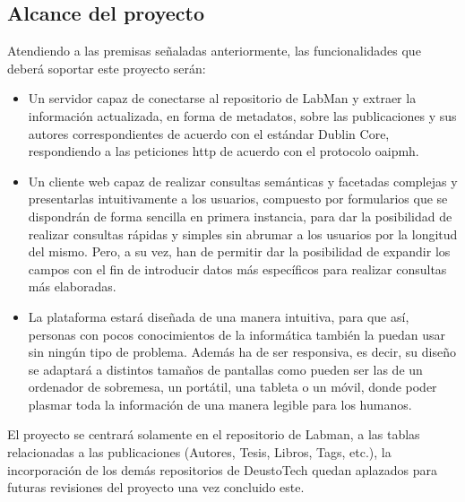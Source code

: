 \subsection{Alcance del proyecto}

Atendiendo a las premisas señaladas anteriormente, las funcionalidades que deberá soportar este proyecto serán:

\begin{itemize}
	\item Un servidor capaz de conectarse al repositorio de LabMan y extraer la información actualizada, en forma de metadatos, sobre las publicaciones y sus autores correspondientes de acuerdo con el estándar Dublin Core, respondiendo a las peticiones \acrshort{http} de acuerdo con el protocolo \acrshort{oaipmh}.
	
	\item Un cliente web capaz de realizar consultas semánticas y facetadas complejas y presentarlas intuitivamente a los usuarios, compuesto por formularios que se dispondrán de forma sencilla en primera instancia, para dar la posibilidad de realizar consultas rápidas y simples sin abrumar a los usuarios por la longitud del mismo. Pero, a su vez, han de permitir dar la posibilidad de expandir los campos con el fin de introducir datos más específicos para realizar consultas más elaboradas.

	\item La plataforma estará diseñada de una manera intuitiva, para que así, personas con pocos conocimientos de la informática también la puedan usar sin ningún tipo de problema. Además ha de ser responsiva, es decir, su diseño se adaptará a distintos tamaños de pantallas como pueden ser las de un ordenador de sobremesa, un portátil, una tableta o un móvil, donde poder plasmar toda la información de una manera legible para los humanos.
\end{itemize}

El proyecto se centrará solamente en el repositorio de Labman, a las tablas relacionadas a las publicaciones (Autores, Tesis, Libros, Tags, etc.), la incorporación de los demás repositorios de DeustoTech quedan aplazados para futuras revisiones del proyecto una vez concluido este.